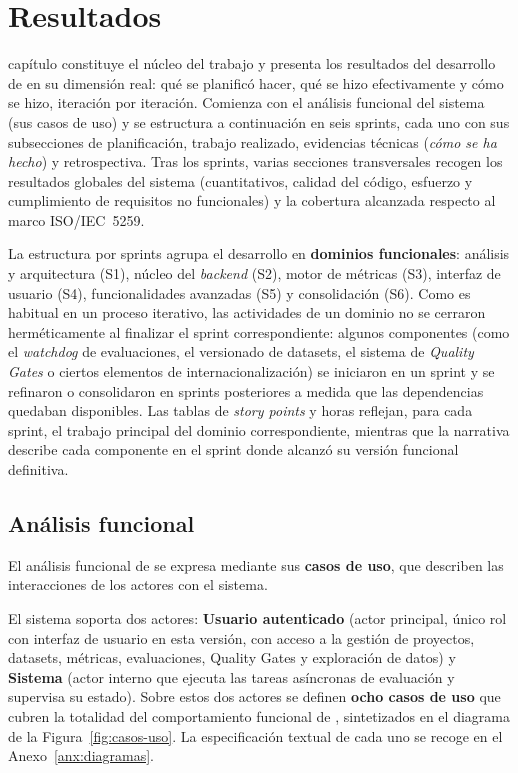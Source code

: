 \chapter{Resultados}
\label{chap:desarrollo}

 capítulo constituye el núcleo del trabajo y presenta los
resultados del desarrollo de \dataqual en su dimensión real: qué se planificó
hacer, qué se hizo efectivamente y cómo se hizo, iteración por iteración.
Comienza con el análisis funcional del sistema (sus casos de uso) y se
estructura a continuación en seis sprints, cada uno con sus subsecciones de
planificación, trabajo realizado, evidencias técnicas (\emph{cómo se ha
hecho}) y retrospectiva.  Tras los sprints, varias secciones transversales
recogen los resultados globales del sistema (cuantitativos, calidad del
código, esfuerzo y cumplimiento de requisitos no funcionales) y la cobertura
alcanzada respecto al marco \ac{ISO}/\ac{IEC}~5259.

La estructura por sprints agrupa el desarrollo en \textbf{dominios
funcionales}: análisis y arquitectura (S1), núcleo del \emph{backend}
(S2), motor de métricas (S3), interfaz de usuario (S4), funcionalidades
avanzadas (S5) y consolidación (S6).  Como es habitual en un proceso
iterativo, las actividades de un dominio no se cerraron herméticamente al
finalizar el sprint correspondiente: algunos componentes (como el
\emph{watchdog} de evaluaciones, el versionado de datasets, el sistema
de \emph{Quality Gates} o ciertos elementos de internacionalización) se
iniciaron en un sprint y se refinaron o consolidaron en sprints
posteriores a medida que las dependencias quedaban disponibles.  Las tablas de \emph{story points} y horas reflejan, para
cada sprint, el trabajo principal del dominio correspondiente, mientras
que la narrativa describe cada componente en el sprint donde alcanzó su
versión funcional definitiva.


\section{Análisis funcional}
\label{sec:requisitos-globales}

El análisis funcional de \dataqual se expresa mediante sus \textbf{casos de
uso}, que describen las interacciones de los actores con el sistema.

El sistema soporta dos actores: \textbf{Usuario autenticado} (actor
principal, único rol con interfaz de usuario en esta versión, con acceso
a la gestión de proyectos, datasets, métricas, evaluaciones, Quality
Gates y exploración de datos) y \textbf{Sistema} (actor interno que
ejecuta las tareas asíncronas de evaluación y supervisa su estado).  Sobre
estos dos actores se definen \textbf{ocho casos de uso} que cubren la
totalidad del comportamiento funcional de \dataqual, sintetizados en el
diagrama de la Figura~\ref{fig:casos-uso}.  La especificación textual de
cada uno se recoge en el Anexo~\ref{anx:diagramas}.


